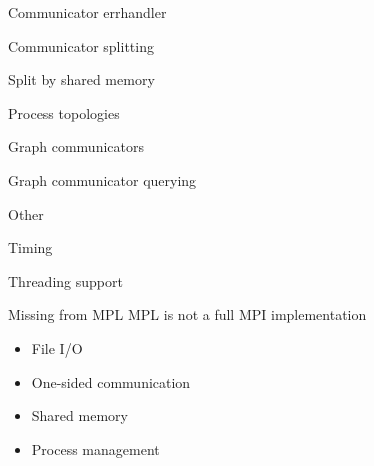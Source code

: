 \documentclass[11pt,headernav]{beamer}
\begin{document}
\begin{numberedframe}{Communicator errhandler}
  
\end{numberedframe}
\begin{numberedframe}{Communicator splitting}
  
\end{numberedframe}
\begin{numberedframe}{Split by shared memory}
  
\end{numberedframe}

 {Process topologies}

\begin{numberedframe}{Graph communicators}
  
\end{numberedframe}
\begin{numberedframe}{Graph communicator querying}
  
\end{numberedframe}

 {Other}

\begin{numberedframe}{Timing}
  
\end{numberedframe}

\begin{numberedframe}{Threading support}
  
\end{numberedframe}

\begin{frame}{Missing from MPL}
  MPL is not a full MPI implementation
  \begin{itemize}
  \item File I/O
  \item One-sided communication
  \item Shared memory
  \item Process management
  \end{itemize}
\end{frame}
\end{document}
